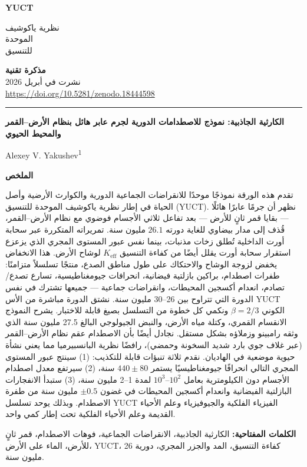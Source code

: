 \documentclass[11pt,a4paper]{article}
\newcommand{\makeheader}{%
	\noindent
	\begin{minipage}{0.17\textwidth}
		\raggedright
		{\sffamily\bfseries\color{skyblue}\fontsize{40}{40}\selectfont YUCT}%
	\end{minipage}%
	\hspace{30pt}
	\begin{minipage}{0.32\textwidth}
		\raggedright
		{\sffamily\fontsize{11}{13}\selectfont نظرية ياكوشيف\\ الموحدة\\ للتنسيق}%
	\end{minipage}%
	\hfill
	\begin{minipage}{0.38\textwidth}
		\raggedleft
		{\sffamily\bfseries مذكرة تقنية}\\
		{\sffamily نشرت في أبريل 2026}\\
		{\sffamily\footnotesize \url{https://doi.org/10.5281/zenodo.18444598}}%
	\end{minipage}
	\par\vspace{5pt}
	\noindent\textcolor{gold}{\rule{\textwidth}{1.6pt}}
	\par\vspace{0pt}
}
\begin{document}
	\thispagestyle{firstpage}
	\makeheader
	
	\vspace{0cm}
	{\LARGE\bfseries الكارثية الجاذبية: نموذج للاصطدامات الدورية لجرم عابر هائل بنظام الأرض–القمر والمحيط الحيوي \par}
	\vspace{0.2cm}
	
	{\large Alexey V. Yakushev\textsuperscript{1}} \\
	\vspace{0.0cm}
	
	{\color{darkblue}\textbf{\LARGE الملخص}} \par
	{\large
		\noindent
		تقدم هذه الورقة نموذجًا موحدًا للانقراضات الجماعية الدورية والكوارث الأرضية وأصل الحياة في إطار نظرية ياكوشيف الموحدة للتنسيق (YUCT). نظهر أن جرمًا عابرًا هائلًا — بقايا قمر ثانٍ للأرض — بعد تفاعل ثلاثي الأجسام فوضوي مع نظام الأرض–القمر، قُذف إلى مدار بيضاوي للغاية دورته \(26.1\) مليون سنة. تمريراته المتكررة عبر سحابة أورت الداخلية تُطلق زخات مذنبات، بينما نفس عبور المستوى المجري الذي يزعزع استقرار سحابة أورت يقلل أيضًا من كفاءة التنسيق \(K_{\mathrm{eff}}\) لوشاح الأرض. هذا الانخفاض يخفض لزوجة الوشاح والاحتكاك على طول مناطق الصدع، منتجًا تسلسلاً متزامنًا: طفرات اصطدام، براكين بازلتية فيضانية، انحرافات جيومغناطيسية، تسارع تصدع/تصادم، انعدام أكسجين المحيطات، وانقراضات جماعية — جميعها تشترك في نفس الدورة التي تتراوح بين 26–30 مليون سنة. نشتق الدورة مباشرة من الأس YUCT الكوني \(\beta = 2/3\) ونكمي كل خطوة من التسلسل بصيغ قابلة للاختبار. يشرح النموذج الانقسام القمري، وكتلة مياه الأرض، والنبض الجيولوجي البالغ 27.5 مليون سنة الذي وثقه رامبينو وزملاؤه بشكل مستقل. نجادل أيضًا بأن الاصطدام عقم نظام الأرض–القمر (عبر غلاف جوي بارد شديد السخونة وحمضي)، رافضًا نظرية البانسبيرميا مما يعني نشأة حيوية موضعية في الهاديان. نقدم ثلاثة تنبؤات قابلة للتكذيب: (1) سينتج عبور المستوى المجري التالي انحرافًا جيومغناطيسيًا يستمر \(440 \pm 80\) سنة، (2) سيرتفع معدل اصطدام الأجسام دون الكيلومترية بعامل \(10^{2}\)–\(10^{3}\) لمدة 1–2 مليون سنة، (3) ستبدأ الانفجارات البازلتية الفيضانية وانعدام أكسجين المحيطات في غضون \(\pm 0.5\) مليون سنة من طفرة الاصطدام. وبذلك يوحد تسلسل YUCT الفيزياء الفلكية والجيوفيزياء وعلم الأحياء القديمة وعلم الأحياء الفلكية تحت إطار كمي واحد.
	}
	
	\vspace{0.1cm}
	\noindent
	{\color{darkblue}\textbf{الكلمات المفتاحية:}} الكارثية الجاذبية، الانقراضات الجماعية، فوهات الاصطدام، قمر ثانٍ للأرض، الماء على الأرض، YUCT، كفاءة التنسيق، المد والجزر المجري، دورية 26 مليون سنة.
	
\end{document}
